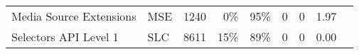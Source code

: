 \begin{table}[ht]
{\begin{tabular}{ l | l r r r | r r | r | l }
      Media Source Extensions                             &  MSE         & 1240  & 0\%          & 95\%  & 0   & 0  & 1.97  & \\ %
      Selectors API Level 1                               &  SLC         & 8611  & 15\%         & 89\%  & 0   & 0  & 0.00  & \\ %

\end{tabular}}
\end{table}
